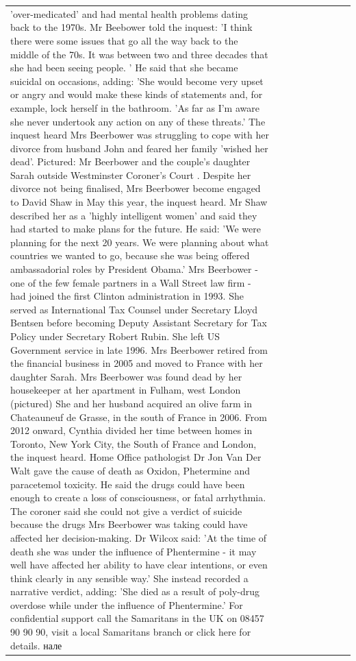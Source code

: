 \begin{table}[H]
\begin{tabular}{lllrlllll}
'over-medicated' and had mental health problems dating back to the 1970s. Mr Beebower told the inquest: 'I think there were some issues that go all the way back to the middle of the 70s. It was between two and three decades that she had been seeing people. ' He said that she became suicidal on occasions, adding: 'She would become very upset or angry and would make these kinds of statements and, for example, lock herself in the bathroom. 'As far as I'm aware she never undertook any action on any of these threats.' The inquest heard Mrs Beerbower was struggling to cope with her divorce from husband John and feared her family 'wished her dead'. Pictured: Mr Beerbower and the couple's daughter Sarah outside Westminster Coroner's Court . Despite her divorce not being finalised, Mrs Beerbower become engaged to David Shaw in May this year, the inquest heard. Mr Shaw described her as a 'highly intelligent women' and said they had started to make plans for the future. He said: 'We were planning for the next 20 years. We were planning about what countries we wanted to go, because she was being offered ambassadorial roles by President Obama.' Mrs Beerbower - one of the few female partners in a Wall Street law firm - had joined the first Clinton administration in 1993. She served as International Tax Counsel under Secretary Lloyd Bentsen before becoming Deputy Assistant Secretary for Tax Policy under Secretary Robert Rubin. She left US Government service in late 1996. Mrs Beerbower retired from the financial business in 2005 and moved to France with her daughter Sarah. Mrs Beerbower was found dead by her housekeeper at her apartment in Fulham, west London (pictured) She and her husband acquired an olive farm in Chateauneuf de Grasse, in the south of France in 2006. From 2012 onward, Cynthia divided her time between homes in Toronto, New York City, the South of France and London, the inquest heard. Home Office pathologist Dr Jon Van Der Walt gave the cause of death as Oxidon, Phetermine and paracetemol toxicity. He said the drugs could have been enough to create a loss of consciousness, or fatal arrhythmia. The coroner said she could not give a verdict of suicide because the drugs Mrs Beerbower was taking could have affected her decision-making. Dr Wilcox said: 'At the time of death she was under the influence of Phentermine - it may well have affected her ability to have clear intentions, or even think clearly in any sensible way.' She instead recorded a narrative verdict, adding: 'She died as a result of poly-drug overdose while under the influence of Phentermine.' For confidential support call the Samaritans in the UK on 08457 90 90 90, visit a local Samaritans branch or click here for details. нале \\

\end{tabular}
\end{table}
